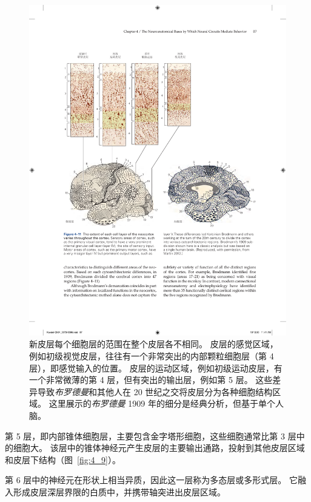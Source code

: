 \begin{figure}[htbp]
	\centering
	\includegraphics[width=1.0\linewidth]{chap04/fig_4_11}
	\caption{新皮层每个细胞层的范围在整个皮层各不相同。
		皮层的感觉区域，例如初级视觉皮层，往往有一个非常突出的内部颗粒细胞层（第 4 层），即感觉输入的位置。
		皮层的运动区域，例如初级运动皮层，有一个非常微薄的第 4 层，但有突出的输出层，例如第 5 层。
		这些差异导致\textit{布罗德曼}和其他人在 20 世纪之交将皮层分为各种细胞结构区域。
		这里展示的\textit{布罗德曼} 1909 年的细分是经典分析，但基于单个人脑\cite{martin2012neuroanatomy}。}
	\label{fig:4_11}
\end{figure}


第 5 层，即内部锥体细胞层，主要包含金字塔形细胞，这些细胞通常比第 3 层中的细胞大。
该层中的锥体神经元产生皮层的主要输出通路，投射到其他皮层区域和皮层下结构（图~\ref{fig:4_9}）。


第 6 层中的神经元在形状上相当异质，因此这一层称为多态层或多形式层。 
它融入形成皮层深层界限的白质中，并携带轴突进出皮层区域。


